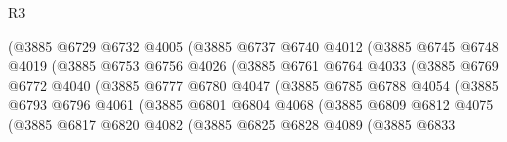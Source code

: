 \begin{lexlean}{R3}
\begin{coremodule}
                            (@3885
                              @6729
                              @6732
                              @4005
                              (@3885
                                @6737
                                @6740
                                @4012
                                (@3885
                                  @6745
                                  @6748
                                  @4019
                                  (@3885
                                    @6753
                                    @6756
                                    @4026
                                    (@3885
                                      @6761
                                      @6764
                                      @4033
                                      (@3885
                                        @6769
                                        @6772
                                        @4040
                                        (@3885
                                          @6777
                                          @6780
                                          @4047
                                          (@3885
                                            @6785
                                            @6788
                                            @4054
                                            (@3885
                                              @6793
                                              @6796
                                              @4061
                                              (@3885
                                                @6801
                                                @6804
                                                @4068
                                                (@3885
                                                  @6809
                                                  @6812
                                                  @4075
                                                  (@3885
                                                    @6817
                                                    @6820
                                                    @4082
                                                    (@3885
                                                      @6825
                                                      @6828
                                                      @4089
                                                      (@3885
                                                        @6833

\end{coremodule}
\end{lexlean}

